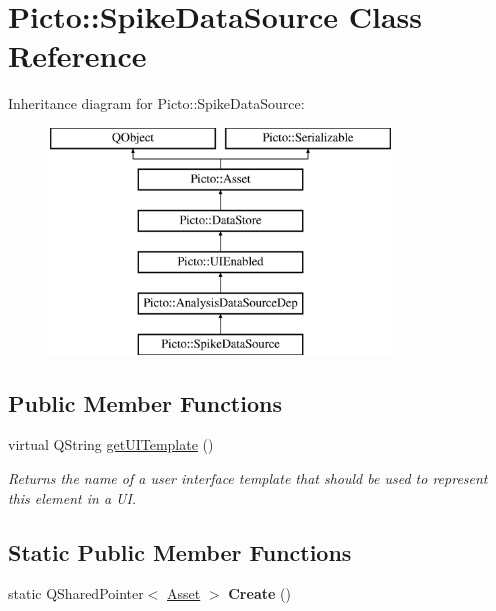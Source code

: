 \hypertarget{class_picto_1_1_spike_data_source}{\section{Picto\-:\-:Spike\-Data\-Source Class Reference}
\label{class_picto_1_1_spike_data_source}
}
Inheritance diagram for Picto\-:\-:Spike\-Data\-Source\-:\begin{figure}[H]
\begin{center}
\leavevmode
\includegraphics[height=6.000000cm]{class_picto_1_1_spike_data_source}
\end{center}
\end{figure}
\subsection*{Public Member Functions}
\begin{DoxyCompactItemize}
\item 
\hypertarget{class_picto_1_1_spike_data_source_a4c4872b4f1fab92f176b99298a082cbd}{virtual Q\-String \hyperlink{class_picto_1_1_spike_data_source_a4c4872b4f1fab92f176b99298a082cbd}{get\-U\-I\-Template} ()}\label{class_picto_1_1_spike_data_source_a4c4872b4f1fab92f176b99298a082cbd}

\begin{DoxyCompactList}\small\item\em Returns the name of a user interface template that should be used to represent this element in a U\-I. \end{DoxyCompactList}\end{DoxyCompactItemize}
\subsection*{Static Public Member Functions}
\begin{DoxyCompactItemize}
\item 
\hypertarget{class_picto_1_1_spike_data_source_a012dab1026443f90f5e86d4d1f8edd3c}{static Q\-Shared\-Pointer$<$ \hyperlink{class_picto_1_1_asset}{Asset} $>$ {\bfseries Create} ()}\label{class_picto_1_1_spike_data_source_a012dab1026443f90f5e86d4d1f8edd3c}

\end{DoxyCompactItemize}
